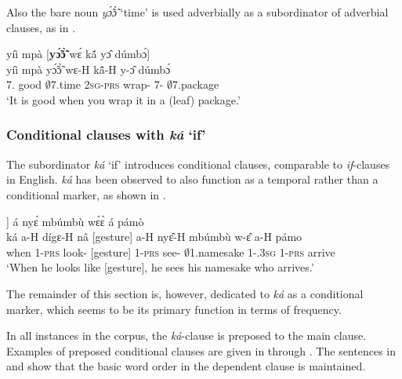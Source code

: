 Also the bare noun {\itshape yɔ̃́ɔ̃̀} `time' is used adverbially as a subordinator of adverbial clauses, as in .


\ea\label{TempREL1}
  \glll yíì mpà [{\bfseries yɔ̃́ɔ̃̀} wɛ́ kã́ yɔ̂ dúmbɔ́]\textsubscript{{\REL}} \\
       yíì mpà {\db}yɔ̃́ɔ̃̀ wɛ-H kã̂-H y-ɔ̂ dúmbɔ́ \\
         7.{\COP} good {\db}$\emptyset$7.time 2\textsc{sg}-\textsc{prs} wrap-{\R} 7-{\OBJ} $\emptyset$7.package\\
    \trans `It is good when you wrap it in a (leaf) package.'
\z












\subsubsection{Conditional clauses with {\itshape ká} `if'}
\label{sec:Cond}

The subordinator {\itshape ká} `if' introduces conditional clauses, comparable to {\itshape if}-clauses in English.
{\itshape ká} has been observed to also function as a temporal rather than a conditional marker, as shown in .


\ea\label{ka1}
  \glll [{\bfseries ká} á dígɛ́ nâ [gesture]] á nyɛ́ mbúmbù wɛ́ɛ̀ á pámò \\
        {\db}ká a-H dígɛ-H nâ [gesture] a-H nyɛ̂-H mbúmbù w-ɛ̂ a-H pámo \\
       {\db}when 1-\textsc{prs} look-{\R} {\COMP} [gesture]  1-\textsc{prs} see-{\R} $\emptyset$1.namesake 1-{\POSS}.3\textsc{sg} 1-\textsc{prs} arrive \\
    \trans `When he looks like [gesture], he sees his namesake who arrives.'
\z

\noindent The remainder of this section is, however, dedicated to {\itshape ká} as a conditional marker, which seems to be its primary function in terms of frequency.

In all instances in the corpus, the {\itshape ká}-clause is preposed to the main clause.  Examples of preposed conditional clauses are given in  through . The sentences in  and  show that the basic word order in the dependent clause is maintained.


